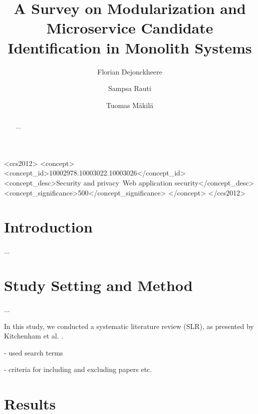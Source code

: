 \documentclass[sigconf]{acmart}
\begin{document}
	\title{A Survey on Modularization and Microservice Candidate Identification in Monolith Systems}

	\author{Florian Dejonckheere}

	\author{Sampsa Rauti}

	\author{Tuomas Mäkilä}

	\begin{abstract}
		...
	\end{abstract}

	\begin{CCSXML}
		<ccs2012>
		<concept>
		<concept_id>10002978.10003022.10003026</concept_id>
		<concept_desc>Security and privacy~Web application security</concept_desc>
		<concept_significance>500</concept_significance>
		</concept>
		</ccs2012>
	\end{CCSXML}



	\maketitle

	\section{Introduction}

	...

	\section{Study Setting and Method}

	...

	In this study, we conducted a systematic literature review (SLR), as presented by Kitchenham et al. \cite{kitchenham2004}.

	- used search terms

	- criteria for including and excluding papers etc.

	\section{Results}
\end{document}
